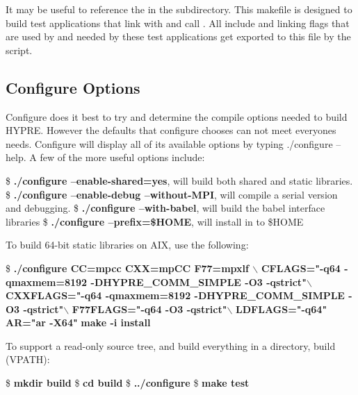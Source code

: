 It may be useful to reference the  in the 
subdirectory.  This makefile is designed to build test applications
that link with and call \hypre{}.  All include and linking flags that
are used by \hypre{} and needed by these test applications get
exported to this file by the  script.

\subsection{Configure Options}

Configure does it best to try and determine the
compile options needed to build HYPRE. However the defaults that
configure chooses can not meet everyones needs. Configure will display
all of its available options by typing ./configure --help. A few of the
more useful options include: 
\begin{ttfamily}
\begin{mdseries}
\linebreak
\$ \textbf{./configure --enable-shared=yes}, will build both 
shared and static libraries.\linebreak
\$ \textbf{./configure --enable-debug --without-MPI}, will compile 
a serial version and debugging.\linebreak
\$ \textbf{./configure --with-babel}, will build the babel interface 
libraries\linebreak
\$ \textbf{./configure --prefix=\$HOME}, will install \hypre{} in 
to \$HOME\linebreak
\end{mdseries}
\end{ttfamily}
To build 64-bit static libraries on AIX, use the following: 
\begin{ttfamily}
\begin{mdseries}
\linebreak
\$ \textbf{./configure CC=mpcc CXX=mpCC F77=mpxlf $\backslash$}\linebreak
\textbf{CFLAGS="-q64 -qmaxmem=8192 -DHYPRE\_COMM\_SIMPLE -O3 
-qstrict"$\backslash$}\linebreak
\textbf{CXXFLAGS="-q64 -qmaxmem=8192 -DHYPRE\_COMM\_SIMPLE -O3 
-qstrict"$\backslash$}\linebreak
\textbf{F77FLAGS="-q64 -O3 -qstrict"$\backslash$}\linebreak
\textbf{LDFLAGS="-q64" AR="ar -X64"}\linebreak
\textbf{make -i install}\linebreak
\end{mdseries}
\end{ttfamily}
To support a read-only source tree, and build everything in a 
directory, build (VPATH):
\begin{ttfamily}
\begin{mdseries}
\linebreak
\$ \textbf{mkdir build}\linebreak
\$ \textbf{cd build}\linebreak
\$ \textbf{../configure}\linebreak
\$ \textbf{make test}\linebreak
\end{mdseries}
\end{ttfamily}

